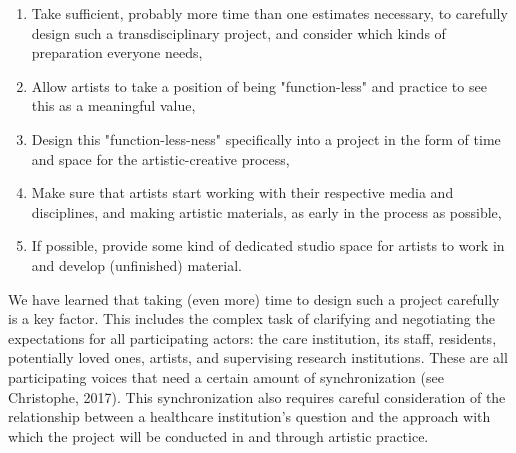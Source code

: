 \documentclass[authordate, empirical]{jote-new-article}
\begin{document}
	\begin{enumerate}


		\item Take sufficient, probably more time than one estimates necessary, to carefully design such a transdisciplinary project, and consider which kinds of preparation everyone needs,



		\item
		Allow artists to take a position of being "function-less" and practice to see this as a meaningful value,



		\item Design this "function-less-ness" specifically into a project in the form of time and space for the artistic-creative process,



		\item
		Make sure that artists start working with their respective media and disciplines, and making artistic materials, as early in the process as possible,



		\item If possible, provide some kind of dedicated studio space for artists to work in and develop (unfinished) material.


	\end{enumerate}





	We have learned that taking (even more) time to design such a project carefully is a key factor. This includes the complex task of clarifying and negotiating the expectations for all participating actors: the care institution, its staff, residents, potentially loved ones, artists, and supervising research institutions. These are all participating voices that need a certain amount of synchronization (see Christophe, 2017). This synchronization also requires careful consideration of the relationship between a healthcare institution's question and the approach with which the project will be conducted in and through artistic practice.
\end{document}
